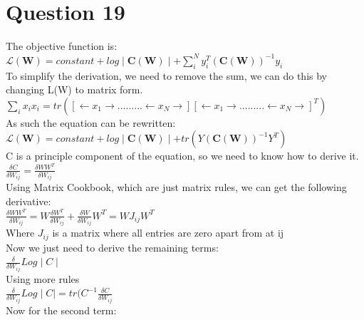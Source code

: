 \documentclass[a4paper, 9pt]{article}
\begin{document}
\section*{Question 19}
The objective function is: \\
\( \mathcal{L} (\mathbf{W}) = constant + log\mid \mathbf{C}(\mathbf{W})\mid + \sum\limits_{i}^N y_{i}^{T}(\mathbf{C}(\mathbf{W}))^{-1} y_{i} \) \\
\newline
To simplify the derivation, we need to remove the sum, we can do this by changing L(W) to matrix form. \\

\( \sum\limits_i x_{i}x_{i} = tr([\leftarrow x_{1} \rightarrow.........\leftarrow x_{N} \rightarrow][\leftarrow x_{1} \rightarrow.........\leftarrow x_{N} \rightarrow]^{T}) \) \\
\newline
As such the equation can be rewritten: \\

\( \mathcal{L}(\mathbf{W}) = constant + log\mid \mathbf{C}(\mathbf{W})\mid + tr(Y(\mathbf{C}(\mathbf{W}))^{-1}Y^T) \) \\
\newline
C is a principle component of the equation, so we need to know how to derive it.\\

\( \frac{\delta C}{\delta W_{ij}} = \frac{\delta WW^T}{\delta W_{ij}} \) \\
\newline
Using Matrix Cookbook, which are just matrix rules, we can get the following derivative: \\

\( \frac{\delta WW^T}{\delta W_{ij}} = W\frac{\delta W^T}{\delta W_{ij}} + \frac{\delta W}{\delta W_{ij}} W^T = WJ_{ij}W^T \) \\

Where \( J_{ij} \) is a matrix where all entries are zero apart from at ij \\
\newline
Now we just need to derive the remaining terms: \\

\( \frac{\delta}{\delta W_{ij}} Log \mid C \mid \) \\
\newline
Using more rules \\

\( \frac{\delta}{\delta W_{ij}} Log \mid C \mid = tr(C^{-1} \frac{\delta C}{\delta W_{ij}} \) \\
\newline
Now for the second term: \\
\end{document}
